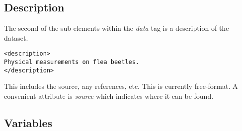 \documentclass{article}
\def\strip#1>{}
\def\Escape#1{\def\next{#1}%
  {\frenchspacing\expandafter\strip\meaning\next}}
\def\file#1{\HREF{#1}{\textbf{\Escape{#1}}}}
\def\XMLTag#1{\textit{#1}}
\def\XMLAttribute#1{\textsl{#1}}
\begin{document}
\begin{comment}
To differentiate between the two formats, the \XMLAttribute{type} is
used when specifying an external color map file to read.  This can be
either \texttt{xml} or \texttt{ascii}.  (See \file{ggobi.dtd})


Each entry can have an identifier attribute.  This is usually an
integer identifying the index by which one can reference this color in
records and other files.  The alternative values for the identifier
attribute are ``fg'' or ``bg''.

The identifier is really only used to override other values read from
a file.  This is due to the fact that subsequent entries without
identifiers occupy the next entry  in the color table.
In other words, the input
\begin{verbatim}
<color id="4" r=".5" g=".5" b="0" />
<color>0 0 1</color>
\end{verbatim}
sets the $5$ entry (in position $4$) to blue ($0 0 1$) since the
previous set entry was indexed explicitly as $4$.


The attribute \XMLAttribute{range} value can be specified for the entire
colormap or on a per-entry basis.  If this is present, it is
interpreted as a numeric value and each value in the entry (or all
entries if specified for the entire colormap) is divided by that
amount.  This allows one to easily use different scales such as 0 to 1
or 0 to 100, etc. This is designed to assist when the software
creating the file does not facilitate such rescaling.
\end{comment}

\subsection{Description}

The second of the sub-elements within the \XMLTag{data} tag is
a description of the dataset.

\begin{verbatim}
<description>
Physical measurements on flea beetles.
</description>
\end{verbatim}

This includes the source, any references, etc.  This is currently
free-format.  A convenient attribute is \XMLAttribute{source} which
indicates where it can be found.

\subsection{Variables}
\end{document}
